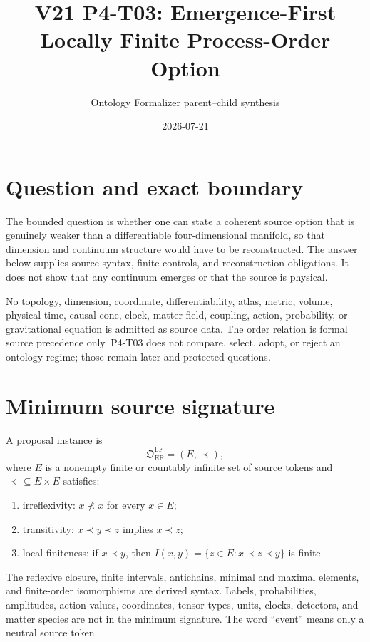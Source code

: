 \documentclass[11pt]{article}
\title{V21 P4-T03: Emergence-First Locally Finite Process-Order Option}
\author{Ontology Formalizer parent--child synthesis}
\date{2026-07-21}
\begin{document}
\maketitle

\begin{center}
\end{center}

\section{Question and exact boundary}

The bounded question is whether one can state a coherent source option that is
genuinely weaker than a differentiable four-dimensional manifold, so that
dimension and continuum structure would have to be reconstructed. The answer
below supplies source syntax, finite controls, and reconstruction obligations.
It does not show that any continuum emerges or that the source is physical.

No topology, dimension, coordinate, differentiability, atlas, metric, volume,
physical time, causal cone, clock, matter field, coupling, action, probability,
or gravitational equation is admitted as source data. The order relation is
formal source precedence only. P4-T03 does not compare, select, adopt, or reject
an ontology regime; those remain later and protected questions.

\section{Minimum source signature}

A proposal instance is
\[
  \mathfrak O_{\mathrm{EF}}^{\mathrm{LF}}=(E,\prec),
\]
where $E$ is a nonempty finite or countably infinite set of source tokens and
$\prec\,\subseteq E\times E$ satisfies:
\begin{enumerate}[label=(S\arabic*)]
  \item irreflexivity: $x\not\prec x$ for every $x\in E$;
  \item transitivity: $x\prec y\prec z$ implies $x\prec z$;
  \item local finiteness: if $x\prec y$, then
  $I(x,y)=\{z\in E:x\prec z\prec y\}$ is finite.
\end{enumerate}
The reflexive closure, finite intervals, antichains, minimal and maximal
elements, and finite-order isomorphisms are derived syntax. Labels,
probabilities, amplitudes, action values, coordinates, tensor types, units,
clocks, detectors, and matter species are not in the minimum signature.
The word ``event'' means only a neutral source token.
\end{document}

